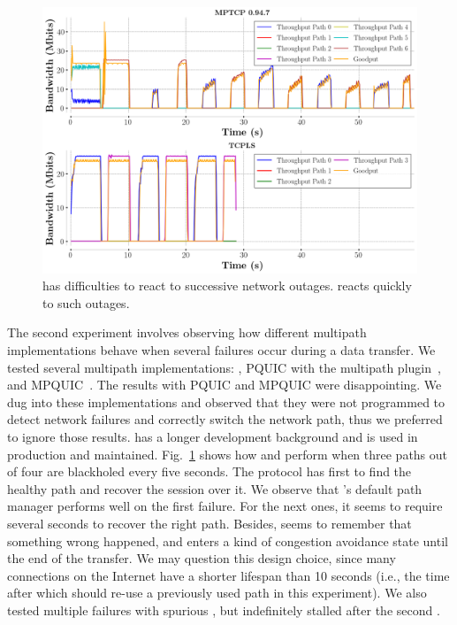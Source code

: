 \begin{figure}[!t]
  \begin{center}
    \includegraphics[width=\columnwidth]{figures/tcpls_mptcp.png}
  \end{center}
\vspace{-0.5cm}
  \caption{\mptcp has difficulties to react to successive network outages. \tcpls reacts quickly to such outages.}
  \label{fig:failover}
\end{figure}

The second experiment involves observing how different multipath
implementations behave when several failures occur during a data transfer. We
tested several multipath implementations: \mptcp, PQUIC with the multipath
plugin~\cite{de2019pluginizing}, and MPQUIC~\cite{de2017multipath}.
The results with PQUIC and MPQUIC were disappointing. We dug into these implementations and observed that they were not programmed to detect network failures and correctly switch the network path, thus we preferred to ignore those results. \mptcp has a longer development background and is used in production and maintained. Fig.~\ref{fig:failover} shows how \mptcp and \tcpls perform when three paths out of four are blackholed every five seconds. The protocol has first to find the healthy path and recover the session over it. We observe that \mptcp's default path manager performs well on the first
failure. For the next ones, it seems to require several seconds to
recover the right path. Besides, \mptcp seems to remember that something wrong
happened, and enters a kind of congestion avoidance state until the end of the
transfer. We may question this design choice, since many \tcp connections on the
Internet have a shorter lifespan than 10 seconds (i.e., the time after which
\mptcp should re-use a previously used path in this experiment). We also tested
multiple failures with spurious \rst, but \mptcp indefinitely stalled after the second \rst.

